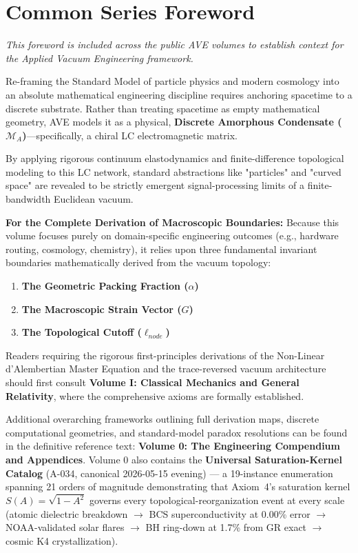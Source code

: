 \chapter*{Common Series Foreword}

\textit{This foreword is included across the public AVE volumes to establish context for the Applied Vacuum Engineering framework.}

\vspace{1em}
\noindent Re-framing the Standard Model of particle physics and modern cosmology into an absolute mathematical engineering discipline requires anchoring spacetime to a discrete substrate. Rather than treating spacetime as empty mathematical geometry, AVE models it as a physical, \textbf{Discrete Amorphous Condensate ($\mathcal{M}_A$)}—specifically, a chiral LC electromagnetic matrix.

By applying rigorous continuum elastodynamics and finite-difference topological modeling to this LC network, standard abstractions like "particles" and "curved space" are revealed to be strictly emergent signal-processing limits of a finite-bandwidth Euclidean vacuum.

\vspace{1em}
\noindent \textbf{For the Complete Derivation of Macroscopic Boundaries:}
Because this volume focuses purely on domain-specific engineering outcomes (e.g., hardware routing, cosmology, chemistry), it relies upon three fundamental invariant boundaries mathematically derived from the vacuum topology:
\begin{enumerate}
    \item \textbf{The Geometric Packing Fraction ($\alpha$)}
    \item \textbf{The Macroscopic Strain Vector ($G$)}
    \item \textbf{The Topological Cutoff ($\ell_{node}$)}
\end{enumerate}

\noindent Readers requiring the rigorous first-principles derivations of the Non-Linear d'Alembertian Master Equation and the trace-reversed vacuum architecture should first consult \textbf{Volume I: Classical Mechanics and General Relativity}, where the comprehensive axioms are formally established.

\noindent Additional overarching frameworks outlining full derivation maps, discrete computational geometries, and standard-model paradox resolutions can be found in the definitive reference text: \textbf{Volume 0: The Engineering Compendium and Appendices}. Volume 0 also contains the \textbf{Universal Saturation-Kernel Catalog} (A-034, canonical 2026-05-15 evening) --- a 19-instance enumeration spanning 21 orders of magnitude demonstrating that Axiom~4's saturation kernel $S(A) = \sqrt{1 - A^2}$ governs every topological-reorganization event at every scale (atomic dielectric breakdown $\to$ BCS superconductivity at 0.00\% error $\to$ NOAA-validated solar flares $\to$ BH ring-down at 1.7\% from GR exact $\to$ cosmic K4 crystallization).
